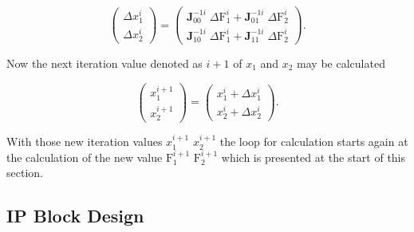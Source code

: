 \documentclass[a4paper, twoside, 11pt]{article}
\newcommand{\fbar}{\FloatBarrier}
\begin{document}
    \begin{equation}
        \begin{pmatrix}
            \Delta x_1^i \\
            \Delta x_2^i
        \end{pmatrix}
        =
        \begin{pmatrix}
            \textbf{J}_{00}^{-1i} \;\Delta \text{F}_1^i + \textbf{J}_{01}^{-1i} \;\Delta \text{F}_2^i\\ 
            \textbf{J}_{10}^{-1i} \;\Delta \text{F}_1^i + \textbf{J}_{11}^{-1i} \;\Delta \text{F}_2^i
        \end{pmatrix}.
    \end{equation}

    \par
    Now the next iteration value denoted as $i+1$ of $x_1$ and $x_2$ may be calculated

    \begin{equation}
        \begin{pmatrix}
            x_1^{i+1}\\
            x_2^{i+1}
        \end{pmatrix}
        =
        \begin{pmatrix}
            x_1^i + \Delta x_1^i\\
            x_2^i + \Delta x_2^i
        \end{pmatrix}.
    \end{equation}
\par
    With those new iteration values $x_1^{i+1}$ $x_2^{i+1}$ the loop for calculation starts again at the calculation of the new value $\text{F}_1^{i+1}$ $\text{F}_2^{i+1}$ which is presented at the start of this section.

    \subsection{IP Block Design}
        
        \fbar
\end{document}
